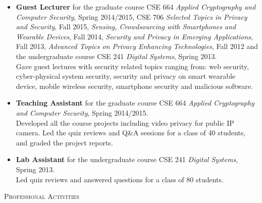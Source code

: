 \documentclass[letter]{article}
\newcommand{\heading}[1]{\item \large \textsc{#1} \normalsize}
\newenvironment{experience}[4]{
\item \textbf{#1.} \hfill #3 - #4 \\
\emph{#2}
}{
}
\begin{document}
\begin{description}


\begin{itemize}
\item \textbf{Guest Lecturer} for the graduate course CSE 664 \emph{Applied Cryptography and Computer Security}, Spring 2014/2015, CSE 706 \emph{Selected Topics in Privacy and Security}, Fall 2015, \emph{Sensing, Crowdsourcing with Smartphones and Wearable Devices}, Fall 2014, \emph{Security and Privacy in Emerging Applications}, Fall 2013, \emph{Advanced Topics on Privacy Enhancing Technologies}, Fall 2012 and the undergraduate course CSE 241 \emph{Digital Systems}, Spring 2013.
\\
Gave guest lectures with security related topics ranging from: web security, cyber-physical system security, security and privacy on smart wearable device, mobile wireless security, smartphone security and malicious software.
\item \textbf{Teaching Assistant} for the graduate course CSE 664 \emph{Applied Cryptography and Computer Security}, Spring 2014/2015.
\\
Developed all the course projects including video privacy for public IP camera. Led the quiz
reviews and Q\&A sessions for a class of 40 students, and graded the project reports.
\item \textbf{Lab Assistant} for the undergraduate course CSE 241 \emph{Digital Systems}, Spring 2013.
\\
Led quiz reviews and answered questions for a class of 80 students.
\end{itemize}

\heading{Professional Activities}


\end{description}
\end{document}
